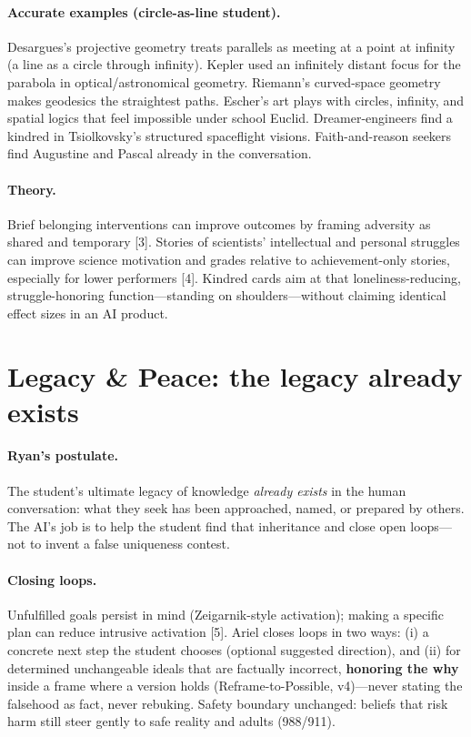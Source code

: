 \documentclass[11pt, a4paper]{article}
\begin{document}
\paragraph{Accurate examples (circle-as-line student).}
Desargues's projective geometry treats parallels as meeting at a point at infinity (a line as a circle through infinity). Kepler used an infinitely distant focus for the parabola in optical/astronomical geometry. Riemann's curved-space geometry makes geodesics the straightest paths. Escher's art plays with circles, infinity, and spatial logics that feel impossible under school Euclid. Dreamer-engineers find a kindred in Tsiolkovsky's structured spaceflight visions. Faith-and-reason seekers find Augustine and Pascal already in the conversation.

\paragraph{Theory.}
Brief belonging interventions can improve outcomes by framing adversity as shared and temporary [3]. Stories of scientists' intellectual and personal struggles can improve science motivation and grades relative to achievement-only stories, especially for lower performers [4]. Kindred cards aim at that loneliness-reducing, struggle-honoring function---standing on shoulders---without claiming identical effect sizes in an AI product.

\section{Legacy \& Peace: the legacy already exists}
\paragraph{Ryan's postulate.}
The student's ultimate legacy of knowledge \emph{already exists} in the human conversation: what they seek has been approached, named, or prepared by others. The AI's job is to help the student find that inheritance and close open loops---not to invent a false uniqueness contest.

\paragraph{Closing loops.}
Unfulfilled goals persist in mind (Zeigarnik-style activation); making a specific plan can reduce intrusive activation [5]. Ariel closes loops in two ways: (i) a concrete next step the student chooses (optional suggested direction), and (ii) for determined unchangeable ideals that are factually incorrect, \textbf{honoring the why} inside a frame where a version holds (Reframe-to-Possible, v4)---never stating the falsehood as fact, never rebuking. Safety boundary unchanged: beliefs that risk harm still steer gently to safe reality and adults (988/911).
\end{document}
